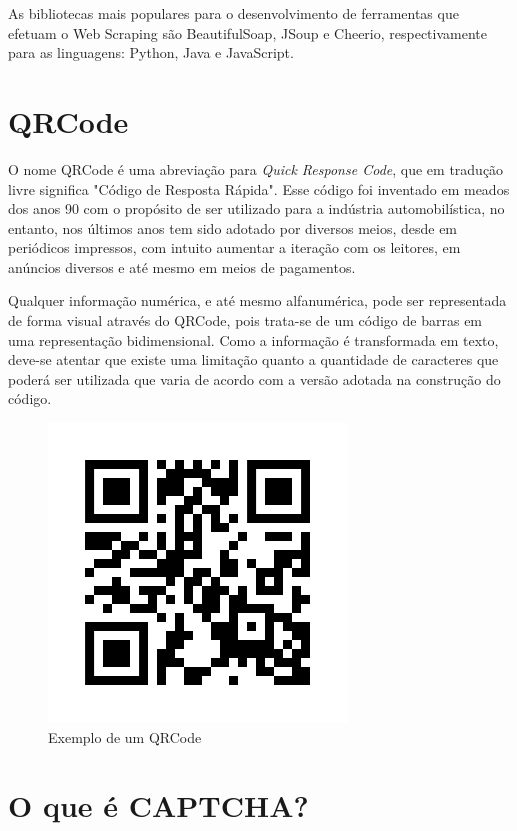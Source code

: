 As bibliotecas mais populares para o desenvolvimento de ferramentas que efetuam o Web Scraping são BeautifulSoap, JSoup e Cheerio, respectivamente para as linguagens: Python, Java e JavaScript.

\section{QRCode}

O nome QRCode é uma abreviação para \textit{Quick Response Code}, que em tradução livre significa "Código de Resposta Rápida". Esse código foi inventado em meados dos anos 90 com o propósito de ser utilizado para a indústria automobilística, no entanto, nos últimos anos tem sido adotado por diversos meios, desde em periódicos impressos, com intuito aumentar a iteração com os leitores, em anúncios diversos e até mesmo em meios de pagamentos.

Qualquer informação numérica, e até mesmo alfanumérica, pode ser representada de forma visual através do QRCode, pois trata-se de um código de barras em uma representação bidimensional. Como a informação é transformada em texto, deve-se atentar que existe uma limitação quanto a quantidade de caracteres que poderá ser utilizada que varia de acordo com a versão adotada na construção do código.

\begin{figure}[h]
    \centering
    \includegraphics[scale=0.5]{tcc/figures/exemplo-qrcode.png}
    \caption{Exemplo de um QRCode}
    \label{fig-exemplo-qrcode}
\end{figure}

\section{O que é CAPTCHA?}

